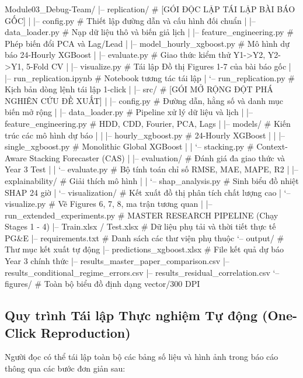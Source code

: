 \begin{aivnoutputbox}
Module03_Debug-Team/
|-- replication/                  # [GÓI ĐỘC LẬP TÁI LẬP BÀI BÁO GỐC]
|   |-- config.py                 # Thiết lập đường dẫn và cấu hình đối chuẩn
|   |-- data_loader.py            # Nạp dữ liệu thô và biến giả lịch
|   |-- feature_engineering.py    # Phép biến đổi PCA và Lag/Lead
|   |-- model_hourly_xgboost.py   # Mô hình dự báo 24-Hourly XGBoost
|   |-- evaluate.py               # Giao thức kiểm thử Y1->Y2, Y2->Y1, 5-Fold CV
|   |-- visualize.py              # Tái lập Đồ thị Figures 1-7 của bài báo gốc
|   |-- run_replication.ipynb     # Notebook tương tác tái lập
|   `-- run_replication.py        # Kịch bản dòng lệnh tái lập 1-click
|
|-- src/                          # [GÓI MỞ RỘNG ĐỘT PHÁ NGHIÊN CỨU ĐỀ XUẤT]
|   |-- config.py                 # Đường dẫn, hằng số và danh mục biến mở rộng
|   |-- data_loader.py            # Pipeline xử lý dữ liệu và lịch
|   |-- feature_engineering.py    # HDD, CDD, Fourier, PCA, Lags
|   |-- models/                   # Kiến trúc các mô hình dự báo
|   |   |-- hourly_xgboost.py     # 24-Hourly XGBoost
|   |   |-- single_xgboost.py     # Monolithic Global XGBoost
|   |   `-- stacking.py           # Context-Aware Stacking Forecaster (CAS)
|   |-- evaluation/               # Đánh giá đa giao thức và Year 3 Test
|   |   `-- evaluate.py           # Bộ tính toán chỉ số RMSE, MAE, MAPE, R2
|   |-- explainability/           # Giải thích mô hình
|   |   `-- shap_analysis.py      # Sinh biểu đồ nhiệt SHAP 24 giờ
|   `-- visualization/            # Kết xuất đồ thị phân tích chất lượng cao
|       `-- visualize.py          # Vẽ Figures 6, 7, 8, ma trận tương quan
|
|-- run_extended_experiments.py   # MASTER RESEARCH PIPELINE (Chạy Stages 1 - 4)
|-- Train.xlsx / Test.xlsx        # Dữ liệu phụ tải và thời tiết thực tế PG&E
|-- requirements.txt              # Danh sách các thư viện phụ thuộc
`-- output/                       # Thư mục kết xuất tự động
    |-- predictions_xgboost.xlsx  # File kết quả dự báo Year 3 chính thức
    |-- results_master_paper_comparison.csv
    |-- results_conditional_regime_errors.csv
    |-- results_residual_correlation.csv
    `-- figures/                  # Toàn bộ biểu đồ định dạng vector/300 DPI
\end{aivnoutputbox}

\subsection{Quy trình Tái lập Thực nghiệm Tự động (One-Click Reproduction)}
Người đọc có thể tái lập toàn bộ các bảng số liệu và hình ảnh trong báo cáo thông qua các bước đơn giản sau:

